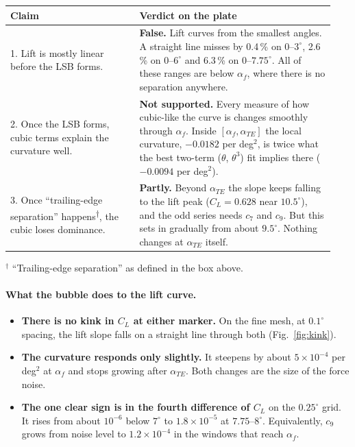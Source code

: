 \documentclass[11pt,a4paper]{article}
\newcommand{\CL}{C_L}
\newcommand{\af}{\alpha_f}
\newcommand{\ate}{\alpha_{TE}}
\begin{document}
\begin{center}
\begin{tabular}{p{0.37\linewidth}p{0.57\linewidth}}
\toprule
Claim & Verdict on the plate \\
\midrule
1. Lift is mostly linear before the LSB forms. &
\textbf{False.} Lift curves from the smallest angles. A straight line misses by 0.4\,\% on
$0$--$3^\circ$, 2.6\,\% on $0$--$6^\circ$ and 6.3\,\% on $0$--$7.75^\circ$. All of these
ranges are below $\af$, where there is no separation anywhere. \\[3pt]
2. Once the LSB forms, cubic terms explain the curvature well. &
\textbf{Not supported.} Every measure of how cubic-like the curve is changes smoothly through
$\af$. Inside $[\af,\ate]$ the local curvature, $-0.0182$ per deg$^2$, is twice what the best
two-term ($\theta$, $\theta^3$) fit implies there ($-0.0094$ per deg$^2$). \\[3pt]
3. Once ``trailing-edge separation'' happens\textsuperscript{$\dagger$}, the cubic loses
dominance. &
\textbf{Partly.} Beyond $\ate$ the slope keeps falling to the lift peak ($\CL = 0.628$ near
$10.5^\circ$), and the odd series needs $c_7$ and $c_9$. But this sets in gradually from about
$9.5^\circ$. Nothing changes at $\ate$ itself. \\
\bottomrule
\end{tabular}

\smallskip
{\small $^\dagger$ ``Trailing-edge separation'' as defined in the box above.}
\end{center}

\paragraph{What the bubble does to the lift curve.}
\begin{itemize}[leftmargin=*]
\item \textbf{There is no kink in $\CL$ at either marker.} On the fine mesh, at $0.1^\circ$
  spacing, the lift slope falls on a straight line through both (Fig.~\ref{fig:kink}).
\item \textbf{The curvature responds only slightly.} It steepens by about $5\times10^{-4}$ per
  deg$^2$ at $\af$ and stops growing after $\ate$. Both changes are the size of the force noise.
\item \textbf{The one clear sign is in the fourth difference of $\CL$} on the $0.25^\circ$
  grid. It rises from about $10^{-6}$ below $7^\circ$ to $1.8\times10^{-5}$ at
  $7.75$--$8^\circ$. Equivalently, $c_9$ grows from noise level to $1.2\times10^{-4}$ in the
  windows that reach $\af$.
\end{itemize}
\end{document}
